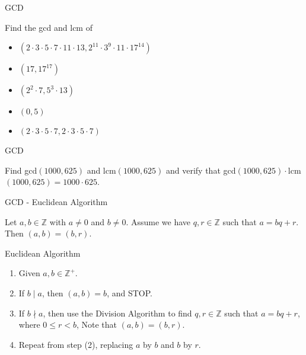 \documentclass{beamer}
\let\cd\cdot
\begin{document}
\begin{frame}{GCD}
    \begin{example}
        Find the gcd and lcm of \begin{itemize}
            \item $(2 \cd 3 \cd 5 \cd 7 \cd 11 \cd 13, 2^{11} \cd 3^9 \cd 11 \cd 17^{14})$
            \vspace{6mm}
            \item $(17, 17^{17})$
            \vspace{6mm}
            \item $(2^2 \cd 7, 5^3 \cd 13)$
            \vspace{6mm}
            \item $(0,5)$
            \vspace{6mm}
            \item $(2 \cd 3 \cd 5 \cd 7, 2 \cd 3 \cd 5 \cd 7)$
            \vspace{8mm}
        \end{itemize}
    \end{example}
\end{frame}

\begin{frame}[t]{GCD}
    \begin{example}
        Find gcd$(1000,625)$ and lcm$(1000,625)$ and verify that gcd$(1000,625) \cdot $lcm$(1000,625) = 1000 \cdot 625$. 
    \end{example}
\end{frame}

\begin{frame}{GCD - Euclidean Algorithm}
    \begin{lemma}
        Let $a,b \in \mathbb{Z}$ with $a \neq 0$ and $b \neq 0$. Assume we have $q,r \in \mathbb{Z}$ such that $a = bq + r$. Then $(a,b) = (b,r)$.
    \end{lemma}
    \begin{block}{Euclidean Algorithm}
        \begin{enumerate}
            \item Given $a,b \in \mathbb{Z^+}$.
            \item If $b \mid a$, then $(a,b) = b$, and STOP.
            \item If $b \nmid a$, then use the Division Algorithm to find $q,r \in \mathbb{Z}$ such that $a = bq + r$, where $0 \leq r < b$, Note that $(a,b) = (b,r)$.
            \item Repeat from step (2), replacing $a$ by $b$ and $b$ by $r$. 
        \end{enumerate}
    \end{block}
\end{frame}
\end{document}
